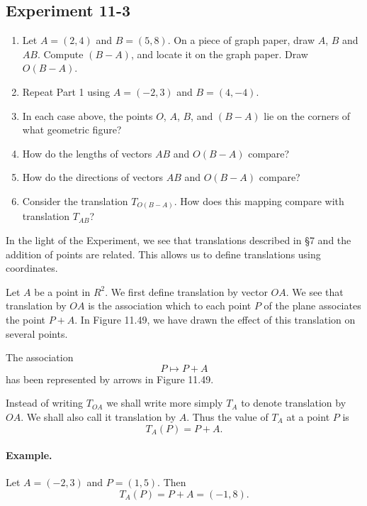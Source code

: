\documentclass[12pt]{book} %
\begin{document}
\begin{ExerciseList}
\subsection*{Experiment 11-3}

\begin{enumerate}
\item Let $A=(2,4)$ and $B=(5,8)$. On a piece of graph paper, draw $A$, $B$
and $AB$. Compute $(B-A)$, and locate it on the graph paper. Draw
$O(B-A)$.

\item Repeat Part 1 using $A=(-2,3)$ and $B=(4,-4)$.

\item In each case above, the points $O$, $A$, $B$, and $(B-A)$ lie on the corners
of what geometric figure?

\item How do the lengths of vectors $AB$ and $O(B-A)$ compare?

\item How do the directions of vectors $AB$ and $O(B-A)$ compare?

\item Consider the translation $T_{O(B-A)}$. How does this mapping compare
with translation $T_{AB}$?
\end{enumerate}

In the light of the Experiment, we see that translations described in \S7
and the addition of points are related. This allows us to define translations using coordinates.

Let $A$ be a point in $R^2$. We first define translation by vector $OA$. We
see that translation by $OA$ is the association which to each point $P$ of
the plane associates the point $P+A$. In Figure 11.49, we have drawn
the effect of this translation on several points.


The association
\[
P\longmapsto P+A
\]
has been represented by arrows in Figure 11.49.

Instead of writing $T_{OA}$ we shall write more simply $T_A$ to denote translation by $OA$. We shall also call it translation by $A$. Thus the value of
$T_A$ at a point $P$ is
\[
T_A(P)=P+A.
\]

\paragraph{Example.}
Let $A=(-2,3)$ and $P=(1,5)$. Then
\[
T_A(P)=P+A=(-1,8).
\]


\end{ExerciseList}
\end{document}
